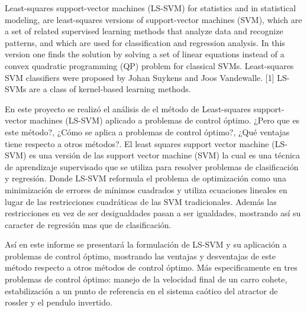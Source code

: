 Least-squares support-vector machines (LS-SVM) for statistics and in statistical modeling,
are least-squares versions of support-vector machines (SVM),
which are a set of related supervised learning methods that analyze data and recognize patterns,
and which are used for classification and regression analysis.
In this version one finds the solution by solving a set of linear equations instead of a convex quadratic programming (QP) problem for classical SVMs.
Least-squares SVM classifiers were proposed by Johan Suykens and Joos Vandewalle.
[1] LS-SVMs are a class of kernel-based learning methods. 

En este proyecto se realizó el análisis de el método de Least-squares support-vector machines (LS-SVM) aplicado a problemas de control óptimo.
¿Pero que es este método?, ¿Cómo se aplica a problemas de control óptimo?, ¿Qué ventajas tiene respecto a otros métodos?.
El least squares support vector machine (LS-SVM) es una versión de las support vector machine (SVM) la cual es una técnica de aprendizaje supervisado que se utiliza para resolver problemas de clasificación y regresión.
Donde LS-SVM reformula el problema de optimización como una minimización de errores de mínimos cuadrados y utiliza ecuaciones lineales en lugar de las restricciones cuadráticas de las SVM tradicionales.
Además las restricciones en vez de ser desigualdades pasan a ser igualdades, mostrando así su caracter de regresión mas que de clasificación.

Así en este informe se presentará la formulación de LS-SVM y su aplicación a problemas de control óptimo, mostrando las ventajas y desventajas de este método respecto a otros métodos de control óptimo.
Más especificamente en tres problemas de control óptimo: manejo de la velocidad final de un carro cohete, estabilización a un punto de referencia en el sistema caótico del atractor de rossler y el pendulo invertido.

